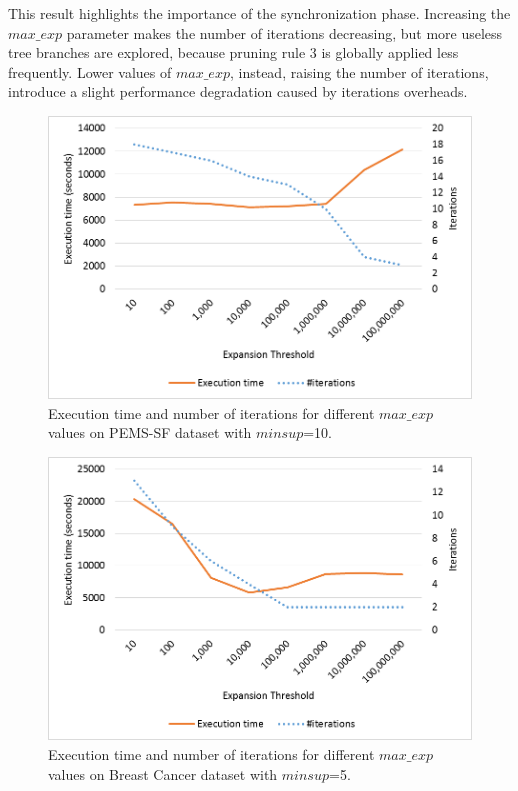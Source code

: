 This result highlights the importance of the synchronization phase.
Increasing the $max\_exp$ parameter makes the number of iterations decreasing,
but more useless tree branches are explored,
because pruning rule 3 is globally applied less frequently.
Lower values of  $max\_exp$, instead, raising the number of iterations, introduce a slight performance
degradation caused by iterations overheads.

\begin{figure}[!t]
\includegraphics[width=5in]{immagini_extension/pems_fixed.png}
\caption{Execution time and number of iterations for different $max\_exp$ values on PEMS-SF dataset with $minsup$=10.
}
\label{pems_fixed}
\end{figure}

\begin{figure}[!t]
\includegraphics[width=5in]{immagini_extension/breast_fixed.png}
\caption{Execution time and number of iterations for different $max\_exp$ values on Breast Cancer dataset with $minsup$=5.
}
\label{breast_fixed}
\end{figure}

